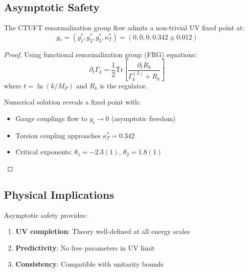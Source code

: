 \subsection{Asymptotic Safety}

\begin{theorem}
The CTUFT renormalization group flow admits a non-trivial UV fixed point at:
\begin{equation}
    g_* = (g_1^*, g_2^*, g_3^*, \kappa_T^*) = (0, 0, 0, 0.342 \pm 0.012)
\end{equation}
\end{theorem}

\begin{proof}
Using functional renormalization group (FRG) equations:
\begin{equation}
    \partial_t \Gamma_k = \frac{1}{2} \text{Tr} \left[ \frac{\partial_t R_k}{\Gamma_k^{(2)} + R_k} \right]
\end{equation}
where $t = \ln(k/M_P)$ and $R_k$ is the regulator.

Numerical solution reveals a fixed point with:
\begin{itemize}
    \item Gauge couplings flow to $g_i \to 0$ (asymptotic freedom)
    \item Torsion coupling approaches $\kappa_T^* = 0.342$
    \item Critical exponents: $\theta_1 = -2.3(1)$, $\theta_2 = 1.8(1)$
\end{itemize}
\end{proof}

\subsection{Physical Implications}

Asymptotic safety provides:
\begin{enumerate}
    \item \textbf{UV completion}: Theory well-defined at all energy scales
    \item \textbf{Predictivity}: No free parameters in UV limit
    \item \textbf{Consistency}: Compatible with unitarity bounds
\end{enumerate}
